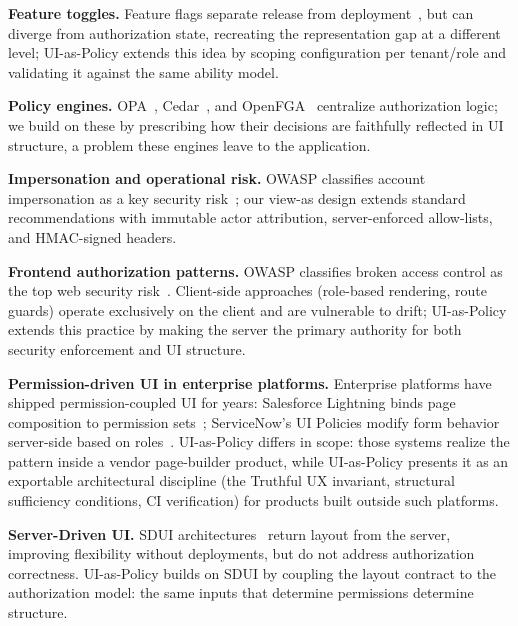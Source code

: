\documentclass[10pt,journal]{IEEEtran}
\newcommand{\uiPolicy}{UI-as-Policy}
\newcommand{\viewas}{view-as}
\begin{document}
\noindent\textbf{Feature toggles.} Feature flags separate release from
deployment~\cite{fowler_feature_toggles}, but can diverge from authorization
state, recreating the representation gap at a different level; \uiPolicy{}
extends this idea by scoping configuration per tenant/role and validating it
against the same ability model.

\noindent\textbf{Policy engines.} OPA~\cite{opa_docs},
Cedar~\cite{cedar_docs,aws_verified_permissions}, and OpenFGA~\cite{openfga_docs}
centralize authorization logic; we build on these by prescribing how their
decisions are faithfully reflected in UI structure, a problem these engines
leave to the application.

\noindent\textbf{Impersonation and operational risk.} OWASP classifies account
impersonation as a key security risk~\cite{owasp_impersonation}; our \viewas{}
design extends standard recommendations with immutable actor attribution,
server-enforced allow-lists, and HMAC-signed headers.

\noindent\textbf{Frontend authorization patterns.} OWASP classifies broken
access control as the top web security risk~\cite{owasp_broken_access}.
Client-side approaches (role-based rendering, route guards) operate exclusively
on the client and are vulnerable to drift; \uiPolicy{} extends this practice
by making the server the primary authority for both security enforcement and
UI structure.

\noindent\textbf{Permission-driven UI in enterprise platforms.} Enterprise
platforms have shipped permission-coupled UI for years: Salesforce Lightning
binds page composition to permission sets~\cite{salesforce_lightning};
ServiceNow's UI Policies modify form behavior server-side based on
roles~\cite{servicenow_ui_policy}. \uiPolicy{} differs in scope: those
systems realize the pattern inside a vendor page-builder product, while
\uiPolicy{} presents it as an exportable architectural discipline (the
Truthful UX invariant, structural sufficiency conditions, CI verification)
for products built outside such platforms.

\noindent\textbf{Server-Driven UI.} SDUI architectures~\cite{airbnb_sdui}
return layout from the server, improving flexibility without deployments, but
do not address authorization correctness. \uiPolicy{} builds on SDUI by
coupling the layout contract to the authorization model: the same inputs that
determine permissions determine structure.

\end{document}
